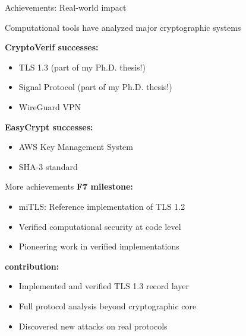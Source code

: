 \documentclass[aspectratio=169, lualatex, handout]{beamer}
\begin{document}
\begin{frame}{Achievements: Real-world impact}
	\begin{center}
		\Large
		Computational tools have analyzed major cryptographic systems
	\end{center}
	\vspace{1em}
	\textbf{CryptoVerif successes:}
	\begin{itemize}
		\item TLS 1.3 (part of my Ph.D. thesis!)
		\item Signal Protocol (part of my Ph.D. thesis!)
		\item WireGuard VPN
	\end{itemize}
	\vspace{0.5em}
	\textbf{EasyCrypt successes:}
	\begin{itemize}
		\item AWS Key Management System
		\item SHA-3 standard
	\end{itemize}
\end{frame}

\begin{frame}{More achievements}
	\textbf{F7 milestone:}
	\begin{itemize}
		\item miTLS: Reference implementation of TLS 1.2
		\item Verified computational security at code level
		\item Pioneering work in verified implementations
	\end{itemize}
	\vspace{0.5em}
	\textbf{\fstar contribution:}
	\begin{itemize}
		\item Implemented and verified TLS 1.3 record layer
		\item Full protocol analysis beyond cryptographic core
		\item Discovered new attacks on real protocols
	\end{itemize}
\end{frame}
\end{document}
